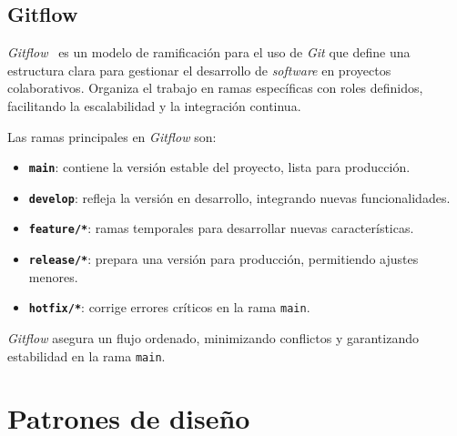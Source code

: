 


\subsection{Gitflow}

\textit{Gitflow}~\cite{web:Gitflow} es un modelo de ramificación para el uso de \textit{Git} que define una 
estructura clara para gestionar el desarrollo de \textit{software} en proyectos colaborativos. 
Organiza el trabajo en ramas específicas con roles definidos, 
facilitando la escalabilidad y la integración continua.

Las ramas principales en \textit{Gitflow} son:
\begin{itemize}
    \item \textbf{\texttt{main}}: contiene la versión estable del proyecto, lista para producción.
    \item \textbf{\texttt{develop}}: refleja la versión en desarrollo, integrando nuevas funcionalidades.
    \item \textbf{\texttt{feature/*}}: ramas temporales para desarrollar nuevas características.
    \item \textbf{\texttt{release/*}}: prepara una versión para producción, permitiendo ajustes menores.
    \item \textbf{\texttt{hotfix/*}}: corrige errores críticos en la rama \texttt{main}.
\end{itemize}

\textit{Gitflow} asegura un flujo ordenado, minimizando conflictos y garantizando estabilidad en la rama \texttt{main}.

\section{Patrones de diseño}

